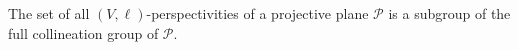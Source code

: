 The set of all $(V,\ell)$-perspectivities of a projective plane $\mathcal{P}$ is a subgroup of the full collineation group of $\mathcal{P}$.

